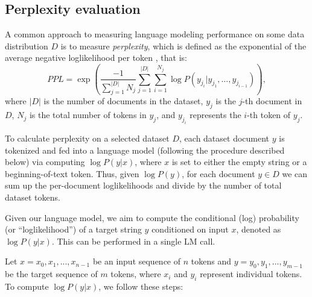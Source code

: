 \subsection{Perplexity evaluation}
\label{sec:Perplexity evaluation}
A common approach to measuring language modeling performance on some data distribution $D$ is to measure \textit{perplexity}, which is defined as the exponential of the average negative loglikelihood per token \cite{perplexityjelinek, brown1992estimate,biderman2024lessons}, that is:
\begin{equation}
PPL = \exp\left(\frac{-1}{\sum_{j=1}^{|D|}N_j}\sum_{j=1}^{|D|}\sum_{i=1}^{N_j}\log P(y_{j_i}|y_{j_1}, \dots, y_{j_{i-1}})\right),
\end{equation}\label{eqn:ppl} where $|D|$ is the number of documents in the dataset, $y_j$ is the $j$-th document in $D$, $N_j$ is the total number of tokens in $y_j$, and $y_{j_i}$ represents the $i$-th token of $y_j$.

To calculate perplexity on a selected dataset $D$, each dataset document $y$ is tokenized and fed into a language model (following the procedure described below) via computing $\log P(y|x)$, where $x$ is set to either the empty string or a beginning-of-text token. Thus, given $\log P(y)$, for each document $y \in D$ we can sum up the per-document loglikelihoods and divide by the number of total dataset tokens.  



Given our language model, we aim to compute the conditional (log) probability (or ``loglikelihood'') of a target string $y$ conditioned on input $x$, denoted as $\log P(y|x)$. This can be performed in a single LM call.

Let $x = x_0, x_1, ..., x_{n-1}$ be an input sequence of $n$ tokens and $y = y_{0}, y_{1}, ..., y_{m-1}$ be the target sequence of $m$ tokens, where $x_i$ and $y_i$ represent individual tokens. To compute $\log P(y|x)$, we follow these steps:


